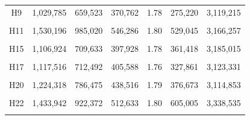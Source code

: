 \documentclass[
  a4paper,
  titlepage]{article}
\begin{document}
\begin{longtable}[t]{ccccccc}
H9 & 1,029,785 & 659,523 & 370,762 & 1.78 & 275,220 & 3,119,215\\
 
\cellcolor{gray!6}{H10} & \cellcolor{gray!6}{1,599,479} & \cellcolor{gray!6}{1,027,101} & \cellcolor{gray!6}{573,643} & \cellcolor{gray!6}{1.79} & \cellcolor{gray!6}{621,465} & \cellcolor{gray!6}{3,201,220}\\
 
H11 & 1,530,196 & 985,020 & 546,286 & 1.80 & 529,045 & 3,166,257\\
 
\cellcolor{gray!6}{H13} & \cellcolor{gray!6}{1,345,369} & \cellcolor{gray!6}{860,461} & \cellcolor{gray!6}{485,748} & \cellcolor{gray!6}{1.77} & \cellcolor{gray!6}{434,088} & \cellcolor{gray!6}{3,165,460}\\
 
H15 & 1,106,924 & 709,633 & 397,928 & 1.78 & 361,418 & 3,185,015\\
 
\cellcolor{gray!6}{H16} & \cellcolor{gray!6}{1,305,955} & \cellcolor{gray!6}{834,303} & \cellcolor{gray!6}{472,478} & \cellcolor{gray!6}{1.77} & \cellcolor{gray!6}{440,067} & \cellcolor{gray!6}{3,211,584}\\
 
H17 & 1,117,516 & 712,492 & 405,588 & 1.76 & 327,861 & 3,123,331\\
 
\cellcolor{gray!6}{H18} & \cellcolor{gray!6}{1,354,989} & \cellcolor{gray!6}{867,866} & \cellcolor{gray!6}{488,028} & \cellcolor{gray!6}{1.78} & \cellcolor{gray!6}{476,859} & \cellcolor{gray!6}{3,301,422}\\
 
H20 & 1,224,318 & 786,475 & 438,516 & 1.79 & 376,673 & 3,114,853\\
 
\cellcolor{gray!6}{H21} & \cellcolor{gray!6}{1,309,458} & \cellcolor{gray!6}{843,229} & \cellcolor{gray!6}{466,998} & \cellcolor{gray!6}{1.81} & \cellcolor{gray!6}{475,232} & \cellcolor{gray!6}{3,044,031}\\
 
H22 & 1,433,942 & 922,372 & 512,633 & 1.80 & 605,005 & 3,338,535\\
 
\cellcolor{gray!6}{H23} & \cellcolor{gray!6}{1,149,905} & \cellcolor{gray!6}{738,689} & \cellcolor{gray!6}{411,826} & \cellcolor{gray!6}{1.79} & \cellcolor{gray!6}{377,140} & \cellcolor{gray!6}{2,974,030}\\
 

\end{longtable}
\end{document}
